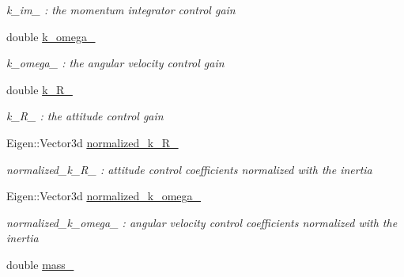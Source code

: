 \begin{DoxyCompactItemize}
\begin{DoxyCompactList}\small\item\em k\-\_\-im\-\_\- \-: the momentum integrator control gain \end{DoxyCompactList}\item 
\hypertarget{class_skye_geometric_controller_a86653a2b4757f45cd62862f167188e58}{double \hyperlink{class_skye_geometric_controller_a86653a2b4757f45cd62862f167188e58}{k\-\_\-omega\-\_\-}}\label{class_skye_geometric_controller_a86653a2b4757f45cd62862f167188e58}

\begin{DoxyCompactList}\small\item\em k\-\_\-omega\-\_\- \-: the angular velocity control gain \end{DoxyCompactList}\item 
\hypertarget{class_skye_geometric_controller_a9b851fbcdc2f38c99d95011902024100}{double \hyperlink{class_skye_geometric_controller_a9b851fbcdc2f38c99d95011902024100}{k\-\_\-\-R\-\_\-}}\label{class_skye_geometric_controller_a9b851fbcdc2f38c99d95011902024100}

\begin{DoxyCompactList}\small\item\em k\-\_\-\-R\-\_\- \-: the attitude control gain \end{DoxyCompactList}\item 
\hypertarget{class_skye_geometric_controller_af9681a8efa6c5ebfae8394539e6cdf01}{Eigen\-::\-Vector3d \hyperlink{class_skye_geometric_controller_af9681a8efa6c5ebfae8394539e6cdf01}{normalized\-\_\-k\-\_\-\-R\-\_\-}}\label{class_skye_geometric_controller_af9681a8efa6c5ebfae8394539e6cdf01}

\begin{DoxyCompactList}\small\item\em normalized\-\_\-k\-\_\-\-R\-\_\- \-: attitude control coefficients normalized with the inertia \end{DoxyCompactList}\item 
\hypertarget{class_skye_geometric_controller_a4346afc258d59ee51ec4726bc8f971fe}{Eigen\-::\-Vector3d \hyperlink{class_skye_geometric_controller_a4346afc258d59ee51ec4726bc8f971fe}{normalized\-\_\-k\-\_\-omega\-\_\-}}\label{class_skye_geometric_controller_a4346afc258d59ee51ec4726bc8f971fe}

\begin{DoxyCompactList}\small\item\em normalized\-\_\-k\-\_\-omega\-\_\- \-: angular velocity control coefficients normalized with the inertia \end{DoxyCompactList}\item 
\hypertarget{class_skye_geometric_controller_acd5d07ef7dcabd011a285a09d10d2bc9}{double \hyperlink{class_skye_geometric_controller_acd5d07ef7dcabd011a285a09d10d2bc9}{mass\-\_\-}}\label{class_skye_geometric_controller_acd5d07ef7dcabd011a285a09d10d2bc9}


\end{DoxyCompactItemize}
